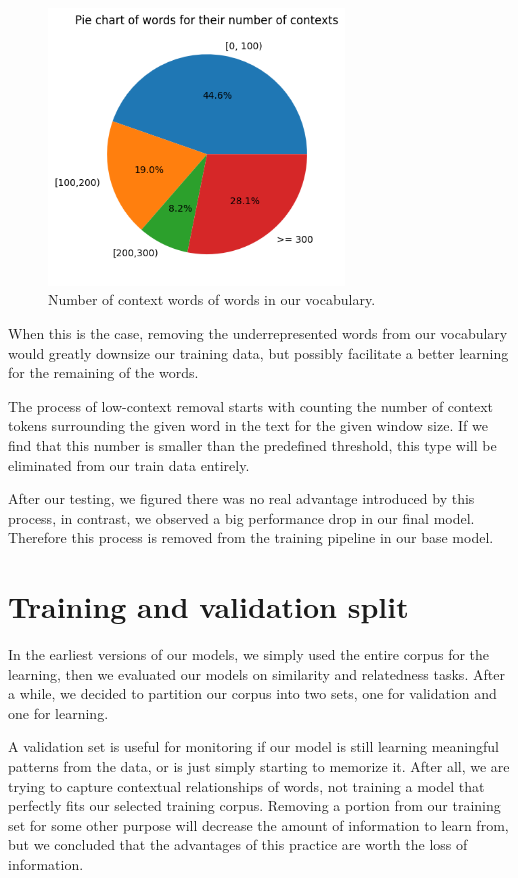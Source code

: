 \begin{figure}[ht]
    \centering
    \includegraphics[width=0.7\textwidth]{img/context_pie.png}
    \caption{Number of context words of words in our vocabulary.}
    \label{fig:context_pie}
\end{figure}

When this is the case, removing the underrepresented words from our vocabulary would greatly downsize our training data, but possibly facilitate a better learning for the remaining of the words.

The process of low-context removal starts with counting the number of context tokens surrounding the given word in the text for the given window size. If we find that this number is smaller than the predefined threshold, this type will be eliminated from our train data entirely.

After our testing, we figured there was no real advantage introduced by this process, in contrast, we observed a big performance drop in our final model. Therefore this process is removed from the training pipeline in our base model.

\section{Training and validation split}
\label{sec:val_split}

In the earliest versions of our models, we simply used the entire corpus for the learning, then we evaluated our models on similarity and relatedness tasks. After a while, we decided to partition our corpus into two sets, one for validation and one for learning. 

A validation set is useful for monitoring if our model is still learning meaningful patterns from the data, or is just simply starting to memorize it. After all, we are trying to capture contextual relationships of words, not training a model that perfectly fits our selected training corpus. Removing a portion from our training set for some other purpose will decrease the amount of information to learn from, but we concluded that the advantages of this practice are worth the loss of information.

